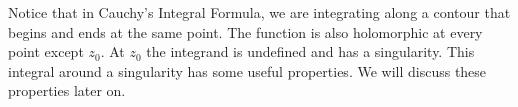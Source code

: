 Notice that in Cauchy's Integral Formula, we are integrating along a contour that begins and ends at the same point.
The function is also holomorphic at every point except $z_0$. At $z_0$ the integrand is undefined and has a singularity.
This integral around a singularity has some useful properties.
We will discuss these properties later on.
